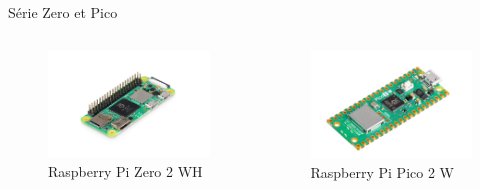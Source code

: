 \documentclass[aspectratio=169,xcolor=dvipsnames]{beamer}
\begin{document}

\begin{frame}{Série Zero et Pico}
    \begin{columns}[c] %

        \begin{figure}
            \includegraphics[width=1\textwidth]{images/rpi-zero.png}
            \captionsetup{labelformat=empty}
            \caption{Raspberry Pi Zero 2 WH}
        \end{figure}

        \begin{figure}
            \includegraphics[width=1\textwidth]{images/rpi-pico.png}
            \captionsetup{labelformat=empty}
            \caption{Raspberry Pi Pico 2 W}
        \end{figure}

    \end{columns}
\end{frame}
\end{document}

